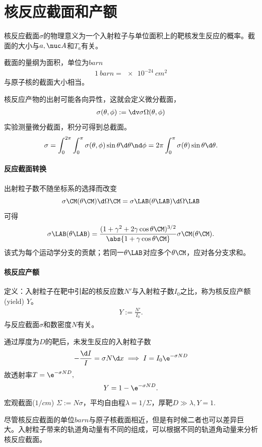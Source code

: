 \section{核反应截面和产额}
核反应截面$\sigma$的物理意义为一个入射粒子与单位面积上的靶核发生反应的概率。截面的大小与$a,\nuc A$和$T_a$有关。

截面的量纲为面积，单位为$\si{barn}$
\begin{align}
	\SI{1}{barn}=\SI{e-24}{cm^2}
\end{align}
与原子核的截面大小相当。

核反应产物的出射可能各向异性，这就会定义微分截面，
\begin{align}
	\sigma(\theta,\phi):=\dv\sigma\Omega(\theta,\phi)
\end{align}
实验测量微分截面，积分可得到总截面。
\[
	\sigma=\int_0^{2\pi}\int_0^\pi\sigma(\theta,\phi)\sin\theta\d\theta\nd\phi=2\pi\int_0^\pi\sigma(\theta)\sin\theta\d\theta.
\]
\paragraph{反应截面转换}出射粒子数不随坐标系的选择而改变
\[
	\sigma\CM(\theta\CM)\d\Omega\CM=\sigma\LAB(\theta\LAB)\d\Omega\LAB
\]
可得
\[
	\sigma\LAB(\theta\LAB)=\frac{(1+\gamma^2+2\gamma\cos\theta\CM)^{3/2}}{\abs{1+\gamma\cos\theta\CM}}\sigma\CM(\theta\CM).
\]
该式为每个运动学分支的贡献；若同一$\theta\LAB$对应多个$\theta\CM$，应对各分支求和。
\paragraph{核反应产额}定义：入射粒子在靶中引起的核反应数$N'$与入射粒子数$I_0$之比，称为核反应产额(yield) $Y$。
\begin{align}
	Y:=\frac{N'}{I_0}.
\end{align}
与反应截面$\sigma$和数密度$N$有关。

通过厚度为$D$的靶后，未发生反应的入射粒子数
\[
	-\frac{\d I}{I}=\sigma N\d x\implies I=I_0\e^{-\sigma ND}
\]
故透射率$T=\e^{-\sigma ND},$
\begin{align}
	Y=1-\e^{-\sigma ND}.
\end{align}
宏观截面($\si{1/cm}$) $\Sigma:=N\sigma$，平均自由程$\lambda=1/\Sigma$，厚靶$D\gg\lambda,Y=1.$

尽管核反应截面的单位$\si{barn}$与原子核截面相近，但是有时候二者也可以差异巨大。入射粒子带来的轨道角动量有不同的组成，可以根据不同的轨道角动量来分析核反应截面。

